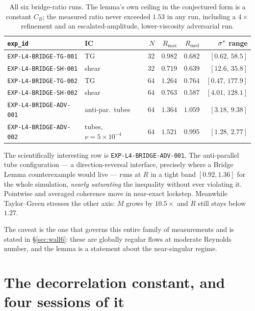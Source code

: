 \begin{table}[ht]
\centering
\small
\begin{tabular}{@{}l l r r r r@{}}
\toprule
\texttt{exp\_id} & IC & \(N\) & \(R_{\max}\) & \(R_{\mathrm{med}}\) &
\(\sigma^{*}\) range \\
\midrule
\texttt{EXP-L4-BRIDGE-TG-001} & TG & \(32\) & \(0.982\) & \(0.682\) & \([0.62,\,58.5]\) \\
\texttt{EXP-L4-BRIDGE-SH-001} & shear & \(32\) & \(0.719\) & \(0.639\) & \([12.6,\,35.8]\) \\
\texttt{EXP-L4-BRIDGE-TG-002} & TG & \(64\) & \(1.264\) & \(0.764\) & \([0.47,\,177.9]\) \\
\texttt{EXP-L4-BRIDGE-SH-002} & shear & \(64\) & \(0.763\) & \(0.587\) & \([4.01,\,128.1]\) \\
\texttt{EXP-L4-BRIDGE-ADV-001} & anti-par.\ tubes & \(64\) & \(1.364\) & \(1.059\) & \([3.18,\,9.38]\) \\
\texttt{EXP-L4-BRIDGE-ADV-002} & tubes, \(\nu=5\!\times\!10^{-4}\) & \(64\) & \(1.521\) & \(0.995\) & \([1.28,\,2.77]\) \\
\bottomrule
\end{tabular}
\caption[The bridge-ratio measurements]{All six bridge-ratio runs. The lemma's
own ceiling in the conjectured form is a constant \(C_B\); the measured ratio
never exceeded \(1.53\) in any run, including a \(4\times\) refinement and an
escalated-amplitude, lower-viscosity adversarial run.}
\label{tab:bridge}
\end{table}

The scientifically interesting row is \texttt{EXP-L4-BRIDGE-ADV-001}. The
anti-parallel tube configuration --- a direction-reversal interface, precisely
where a Bridge Lemma counterexample would live --- runs at \(R\) in a tight
band \([0.92,1.36]\) for the whole simulation, \emph{nearly saturating} the
inequality without ever violating it. Pointwise and averaged coherence move in
near-exact lockstep. Meanwhile Taylor--Green stresses the other axis: \(M\)
grows by \(10.5\times\) and \(R\) still stays below \(1.27\).

The caveat is the one that governs this entire family of measurements and is
stated in \S\ref{sec:wall6}: these are globally regular flows at moderate
Reynolds number, and the lemma is a statement about the near-singular regime.

\section{The decorrelation constant, and four sessions of it}
\label{sec:ck}

